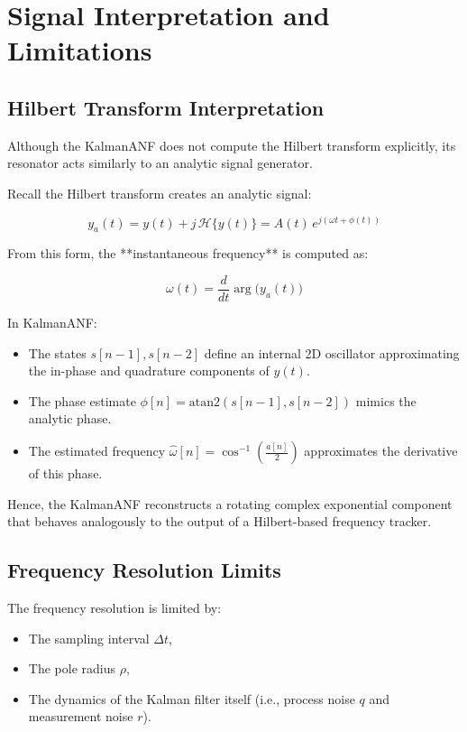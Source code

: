 \documentclass{article}
\begin{document}
\section{Signal Interpretation and Limitations}

\subsection{Hilbert Transform Interpretation}

Although the KalmanANF does not compute the Hilbert transform explicitly, its resonator acts similarly to an analytic signal generator.

Recall the Hilbert transform creates an analytic signal:

\[
y_a(t) = y(t) + j\,\mathcal{H}\{y(t)\} = A(t)\,e^{j(\omega t + \phi(t))}
\]

From this form, the **instantaneous frequency** is computed as:

\[
\omega(t) = \frac{d}{dt} \arg\bigl(y_a(t)\bigr)
\]

In KalmanANF:
\begin{itemize}
  \item The states \(s[n-1], s[n-2]\) define an internal 2D oscillator approximating the in-phase and quadrature components of \(y(t)\).
  \item The phase estimate \(\phi[n] = \mathrm{atan2}(s[n-1], s[n-2])\) mimics the analytic phase.
  \item The estimated frequency \(\hat{\omega}[n] = \cos^{-1}\left(\frac{a[n]}{2}\right)\) approximates the derivative of this phase.
\end{itemize}

Hence, the KalmanANF reconstructs a rotating complex exponential component that behaves analogously to the output of a Hilbert-based frequency tracker.

\subsection{Frequency Resolution Limits}

The frequency resolution is limited by:
\begin{itemize}
    \item The sampling interval \(\Delta t\),
    \item The pole radius \(\rho\),
    \item The dynamics of the Kalman filter itself (i.e., process noise \(q\) and measurement noise \(r\)).
\end{itemize}
\end{document}
